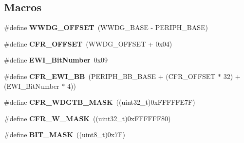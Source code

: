 \subsection*{Macros}
\begin{DoxyCompactItemize}
\item 
\hypertarget{group___w_w_d_g_gab6dcdf2385dd7317ec775e146cff40ca}{\#define {\bfseries W\-W\-D\-G\-\_\-\-O\-F\-F\-S\-E\-T}~(W\-W\-D\-G\-\_\-\-B\-A\-S\-E -\/ P\-E\-R\-I\-P\-H\-\_\-\-B\-A\-S\-E)}\label{group___w_w_d_g_gab6dcdf2385dd7317ec775e146cff40ca}

\item 
\hypertarget{group___w_w_d_g_ga3e0f9d9f7f69a6d133bba721e25aca4a}{\#define {\bfseries C\-F\-R\-\_\-\-O\-F\-F\-S\-E\-T}~(W\-W\-D\-G\-\_\-\-O\-F\-F\-S\-E\-T + 0x04)}\label{group___w_w_d_g_ga3e0f9d9f7f69a6d133bba721e25aca4a}

\item 
\hypertarget{group___w_w_d_g_ga97c9005823520f5aaefe211923b48215}{\#define {\bfseries E\-W\-I\-\_\-\-Bit\-Number}~0x09}\label{group___w_w_d_g_ga97c9005823520f5aaefe211923b48215}

\item 
\hypertarget{group___w_w_d_g_gaa48804210cea547f0e0f4ca49c44fc94}{\#define {\bfseries C\-F\-R\-\_\-\-E\-W\-I\-\_\-\-B\-B}~(P\-E\-R\-I\-P\-H\-\_\-\-B\-B\-\_\-\-B\-A\-S\-E + (C\-F\-R\-\_\-\-O\-F\-F\-S\-E\-T $\ast$ 32) + (E\-W\-I\-\_\-\-Bit\-Number $\ast$ 4))}\label{group___w_w_d_g_gaa48804210cea547f0e0f4ca49c44fc94}

\item 
\hypertarget{group___w_w_d_g_gab500f6978b5964c1de28e59e7ac98012}{\#define {\bfseries C\-F\-R\-\_\-\-W\-D\-G\-T\-B\-\_\-\-M\-A\-S\-K}~((uint32\-\_\-t)0x\-F\-F\-F\-F\-F\-E7\-F)}\label{group___w_w_d_g_gab500f6978b5964c1de28e59e7ac98012}

\item 
\hypertarget{group___w_w_d_g_gab99b48f5d1720c22c2ef8d8a5f934a11}{\#define {\bfseries C\-F\-R\-\_\-\-W\-\_\-\-M\-A\-S\-K}~((uint32\-\_\-t)0x\-F\-F\-F\-F\-F\-F80)}\label{group___w_w_d_g_gab99b48f5d1720c22c2ef8d8a5f934a11}

\item 
\hypertarget{group___w_w_d_g_ga7d4a1875576135ebdd354a816679d45c}{\#define {\bfseries B\-I\-T\-\_\-\-M\-A\-S\-K}~((uint8\-\_\-t)0x7\-F)}\label{group___w_w_d_g_ga7d4a1875576135ebdd354a816679d45c}

\end{DoxyCompactItemize}
